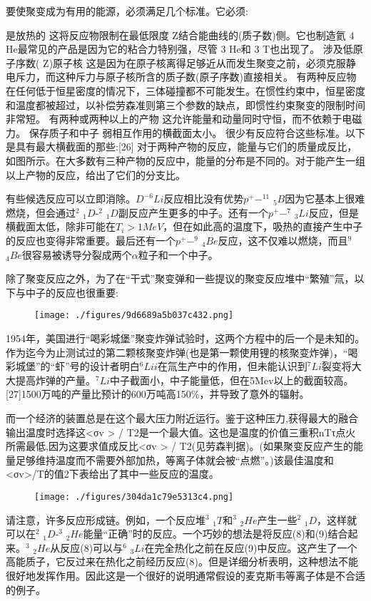 要使聚变成为有用的能源，必须满足几个标准。它必须:

是放热的
这将反应物限制在最低限度 Z结合能曲线的(质子数)侧。它也制造氦 4 He最常见的产品是因为它的粘合力特别强，尽管 3 He和 3 T也出现了。
涉及低原子序数( Z)原子核
这是因为在原子核离得足够近从而发生聚变之前，必须克服静电斥力，而这种斥力与原子核所含的质子数(原子序数)直接相关。
有两种反应物
在任何低于恒星密度的情况下，三体碰撞都不可能发生。在惯性约束中，恒星密度和温度都被超过，以补偿劳森准则第三个参数的缺点，即惯性约束聚变的限制时间非常短。
有两种或两种以上的产物
这允许能量和动量同时守恒，而不依赖于电磁力。
保存质子和中子
弱相互作用的横截面太小。
很少有反应符合这些标准。以下是具有最大横截面的那些:[26]
对于两种产物的反应，能量与它们的质量成反比，如图所示。在大多数有三种产物的反应中，能量的分布是不同的。对于能产生一组以上产物的反应，给出了它们的分支比。

有些候选反应可以立即消除。$D^{-6}Li$反应相比没有优势$p^{+}-^{11}$ $_{5}B$因为它基本上很难燃烧，但会通过$^{2}$ $_1D$-$^{2}$ $_1D$副反应产生更多的中子。还有一个$p^{+}-^{7}$ $_{3}Li$反应，但是横截面太低，除非可能在$T_i> 1 MeV$，但在如此高的温度下，吸热的直接产生中子的反应也变得非常重要。最后还有一个$p^{+}-^{9}$ $_{4}Be$反应，这不仅难以燃烧，而且$^{9}$ $_{4}Be$很容易被诱导分裂成两个$\alpha$粒子和一个中子。

除了聚变反应之外，为了在“干式”聚变弹和一些提议的聚变反应堆中“繁殖”氚，以下与中子的反应也很重要:
\begin{figure}[ht]
\centering
\texttt{[image: ./figures/9d6689a5b037c432.png]}
\caption\label{fig_HJB_7}
\end{figure}
1954年，美国进行“喝彩城堡”聚变炸弹试验时，这两个方程中的后一个是未知的。作为迄今为止测试过的第二颗核聚变炸弹(也是第一颗使用锂的核聚变炸弹)，“喝彩城堡”的“虾”号的设计者明白$^6Lii$在氚生产中的作用，但未能认识到$^7Li$裂变将大大提高炸弹的产量。$^7Li$中子截面小，中子能量低，但在5Mev以上的截面较高。[27]1500万吨的产量比预计的600万吨高150\%，并导致了意外的辐射。

而一个经济的装置总是在这个最大压力附近运行。鉴于这种压力,获得最大的融合输出温度时选择这<σv > / T2是一个最大值。这也是温度的价值三重积nTτ点火所需最低,因为这要求值成反比<σv > / T2(见劳森判据)。(如果聚变反应产生的能量足够维持温度而不需要外部加热，等离子体就会被“点燃”。)该最佳温度和<σv>/T的值2下表给出了其中一些反应的温度。
\begin{figure}[ht]
\centering
\texttt{[image: ./figures/304da1c79e5313c4.png]}
\caption\label{fig_HJB_8}
\end{figure}
请注意，许多反应形成链。例如，一个反应堆$^{3}$ $_{1}T$和$^{3}$ $_{2}He$产生一些$^{2}$ $_{1}D$，这样就可以在$^{2}$ $_{1}D$-$^{3}$ $_{2}He$能量“正确”时的反应。一个巧妙的想法是将反应(8)和(9)结合起来。$^{3}$ $_{2}He$从反应(8)可以与$^{6}$ $_{3}Li$在完全热化之前在反应(9)中反应。这产生了一个高能质子，它反过来在热化之前经历反应(8)。但是详细分析表明，这种想法不能很好地发挥作用。因此这是一个很好的说明通常假设的麦克斯韦等离子体是不合适的例子。
